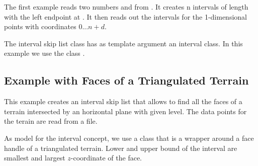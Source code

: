 The first example reads two numbers  and  from .
It creates n intervals of length  with the left endpoint at .
It then reads out the intervals for the 1-dimensional points with
coordinates $0 ... n+d$. 

The interval skip list class has as template argument an interval
class. In this example we use the class .

\newpage
{}

\subsection{Example with Faces of a Triangulated Terrain}



This example creates an interval skip list that allows to find all the faces
of a terrain intersected by an horizontal plane with given level.
The data points for the terain are  read from a file. 

As model for the interval concept, we use a class that is a wrapper
around a face handle of a triangulated terrain. Lower and upper bound
of the interval are smallest and largest $z$-coordinate of the face.








